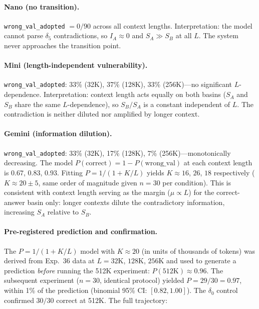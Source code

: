 \documentclass[11pt,a4paper]{article}
\begin{document}
\paragraph{Nano (no transition).} \texttt{wrong\_val\_adopted} $= 0/90$ across all context lengths. Interpretation: the model cannot parse $\delta_5$ contradictions, so $I_A \approx 0$ and $S_A \gg S_B$ at all $L$. The system never approaches the transition point.

\paragraph{Mini (length-independent vulnerability).} \texttt{wrong\_val\_adopted}: 33\% (32K), 37\% (128K), 33\% (256K)---no significant $L$-dependence. Interpretation: context length acts equally on both basins ($S_A$ and $S_B$ share the same $L$-dependence), so $S_B/S_A$ is a constant independent of $L$. The contradiction is neither diluted nor amplified by longer context.

\paragraph{Gemini (information dilution).} \texttt{wrong\_val\_adopted}: 33\% (32K), 17\% (128K), 7\% (256K)---monotonically decreasing. The model $P(\text{correct}) = 1 - P(\text{wrong\_val})$ at each context length is $0.67$, $0.83$, $0.93$. Fitting $P = 1/(1 + K/L)$ yields $K \approx 16$, $26$, $18$ respectively ($K \approx 20 \pm 5$, same order of magnitude given $n = 30$ per condition). This is consistent with context length serving as the margin ($\mu \propto L$) for the correct-answer basin only: longer contexts dilute the contradictory information, increasing $S_A$ relative to $S_B$.

\paragraph{Pre-registered prediction and confirmation.} The $P = 1/(1 + K/L)$ model with $K \approx 20$ (in units of thousands of tokens) was derived from Exp.~36 data at $L = 32\text{K}$, $128\text{K}$, $256\text{K}$ and used to generate a prediction \emph{before} running the 512K experiment: $P(512\text{K}) \approx 0.96$. The subsequent experiment ($n = 30$, identical protocol) yielded $P = 29/30 = 0.97$, within 1\% of the prediction (binomial 95\% CI: $[0.82, 1.00]$). The $\delta_0$ control confirmed $30/30$ correct at 512K. The full trajectory:
\end{document}

